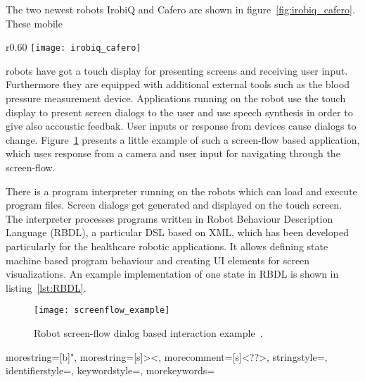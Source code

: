The two newest robots IrobiQ and Cafero are shown in figure~\ref{fig:irobiq_cafero}.
These mobile 
\begin{wrapfigure}{r}{0.60\textwidth}
  \centering
  \texttt{[image: irobiq\_cafero]}
  \caption{IrobiQ and Cafero, two robots of the healtcare project.}
  \label{fig:irobiq_cafero}
\end{wrapfigure}
robots have got a touch display for presenting screens and receiving user input. Furthermore they are equipped with additional external tools such as the blood pressure measurement device.
Applications running on the robot use the touch display to present screen dialogs to the user and use speech synthesis in order to give also accoustic feedbak. User inputs or response from devices cause dialogs to change. Figure~\ref{fig:screenflow_example} presents a little example of such a screen-flow based application, which uses response from a camera and user input for navigating through the screen-flow.


There is a program interpreter running on the robots which can load and execute program files. Screen dialogs get generated and displayed on the touch screen.
The interpreter processes programs written in Robot Behaviour Description Language (RBDL), a particular DSL based on XML, which has been developed particularly for the healthcare robotic applications. It allows defining state machine based program behaviour and creating UI elements for screen visualizations. An example implementation of one state in RBDL is shown in listing~\ref{lst:RBDL}.

\begin{figure}[htbp]
  \centering
  \texttt{[image: screenflow\_example]} 
  \caption{Robot screen-flow dialog based interaction example~\cite{robostudio}.}
  \label{fig:screenflow_example}
\end{figure}


{
  morestring=[b]",
  morestring=[s]{>}{<},
  morecomment=[s]{<?}{?>},
  stringstyle=\color{black},
  identifierstyle=\color{darkblue},
  keywordstyle=\color{cyan},
	morekeywords={%
	}
}

